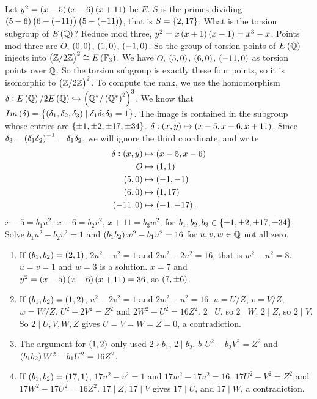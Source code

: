 Let $ y^2 = \br{x - 5}\br{x - 6}\br{x + 11} $ be $ E $. $ S $ is the primes dividing $ \br{5 - 6}\br{6 - \br{-11}}\br{5 - \br{-11}} $, that is $ S = \cbr{2, 17} $. What is the torsion subgroup of $ E\br{\Q} $? Reduce mod three, $ y^2 = x\br{x + 1}\br{x - 1} = x^3 - x $. Points mod three are $ O $, $ \br{0, 0} $, $ \br{1, 0} $, $ \br{-1, 0} $. So the group of torsion points of $ E\br{\Q} $ injects into $ \br{\Z / 2\Z}^2 \cong E\br{\F_3} $. We have $ O $, $ \br{5, 0} $, $ \br{6, 0} $, $ \br{-11, 0} $ as torsion points over $ \mathbb{Q} $. So the torsion subgroup is exactly these four points, so it is isomorphic to $ \br{\Z / 2\Z}^2 $. To compute the rank, we use the homomorphism $ \delta : E\br{\Q} / 2E\br{\Q} \hookrightarrow \br{\Q^* / \br{\Q^*}^2}^3 $. We know that $ Im\br{\delta} = \cbr{\br{\delta_1, \delta_2, \delta_3} \mid \delta_1\delta_2\delta_3 = 1} $. The image is contained in the subgroup whose entries are $ \cbr{\pm 1, \pm 2, \pm 17, \pm 34} $. $ \delta : \br{x, y} \mapsto \br{x - 5, x - 6, x + 11} $. Since $ \delta_3 = \br{\delta_1\delta_2}^{-1} = \delta_1\delta_2 $, we will ignore the third coordinate, and write
\begin{align*}
\delta : \br{x, y} & \mapsto \br{x - 5, x - 6} \\
O & \mapsto \br{1, 1} \\
\br{5, 0} & \mapsto \br{-1, -1} \\
\br{6, 0} & \mapsto \br{1, 17} \\
\br{-11, 0} & \mapsto \br{-1, -17}.
\end{align*}
$ x - 5 = b_1u^2 $, $ x - 6 = b_2v^2 $, $ x + 11 = b_3w^2 $, for $ b_1, b_2, b_3 \in \cbr{\pm 1, \pm 2, \pm 17, \pm 34} $. Solve $ b_1u^2 - b_2v^2 = 1 $ and $ \br{b_1b_2}w^2 - b_1u^2 = 16 $ for $ u, v, w \in \mathbb{Q} $ not all zero.
\begin{enumerate}
\item If $ \br{b_1, b_2} = \br{2, 1} $, $ 2u^2 - v^2 = 1 $ and $ 2w^2 - 2u^2 = 16 $, that is $ w^2 - u^2 = 8 $. $ u = v = 1 $ and $ w = 3 $ is a solution. $ x = 7 $ and $ y^2 = \br{x - 5}\br{x - 6}\br{x + 11} = 36 $, so $ \br{7, \pm 6} $.
\item If $ \br{b_1, b_2} = \br{1, 2} $, $ u^2 - 2v^2 = 1 $ and $ 2w^2 - u^2 = 16 $. $ u = U / Z $, $ v = V / Z $, $ w = W / Z $. $ U^2 - 2V^2 = Z^2 $ and $ 2W^2 - U^2 = 16Z^2 $. $ 2 \mid U $, so $ 2 \mid W $. $ 2 \mid Z $, so $ 2 \mid V $. So $ 2 \mid U, V, W, Z $ gives $ U = V = W = Z = 0 $, a contradiction.
\item The argument for $ \br{1, 2} $ only used $ 2 \nmid b_1 $, $ 2 \mid b_2 $. $ b_1U^2 - b_2V^2 = Z^2 $ and $ \br{b_1b_2}W^2 - b_1U^2 = 16Z^2 $.
\item If $ \br{b_1, b_2} = \br{17, 1} $, $ 17u^2 - v^2 = 1 $ and $ 17w^2 - 17u^2 = 16 $. $ 17U^2 - V^2 = Z^2 $ and $ 17W^2 - 17U^2 = 16Z^2 $. $ 17 \mid Z $, $ 17 \mid V $ gives $ 17 \mid U $, and $ 17 \mid W $, a contradiction.
\end{enumerate}
